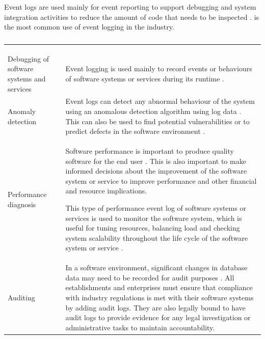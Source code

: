 Event logs are used mainly for event reporting to support debugging and system integration activities to reduce the amount of code that needs to be inspected \cite{Baccanico2014}.  is the most common use of event logging in the industry.

\begin{xltabular}{\textwidth}{p{4cm}X}
	\caption[Event logs usage]
	{\textit{Event logs usage}}
	\label{tbl:ch1_eventLogsUsage} \\
	\toprule
	 &  \\
	\midrule
	\endfirsthead

	\caption[]{\continueCaption} \\
	\toprule
	 &  \\
	\midrule
	\endhead

	\midrule
	 \\ 
	\endfoot
	\endlastfoot

	\RaggedRight Debugging of software systems and services & \RaggedRight Event logging is used mainly to record events or behaviours of software systems or services during its runtime \cite{Rong2018a}. \\

	\RaggedRight Anomaly detection & \RaggedRight Event logs can detect any abnormal behaviour of the system using an anomalous detection algorithm using log data \cite{Gurumdimma2016}. This can also be used to find potential vulnerabilities or to predict defects in the software environment \cite{Dwyer2013}. \\

	Performance diagnosis & \RaggedRight Software performance is important to produce quality software for the end user \cite{EvangelinGeetha2007, Baccanico2014}. This is also important to make informed decisions about the improvement of the software system or service to improve performance and other financial and resource implications. \par This type of performance event log of software systems or services is used to monitor the software system, which is useful for tuning resources, balancing load and checking system scalability throughout the life cycle of the software system or service \cite{Song2017}. \\
	
	Auditing & \RaggedRight In a software environment, significant changes in database data may need to be recorded for audit purposes \cite{Rong2018a}. All establishments and enterprises must ensure that compliance with industry regulations is met with their software systems by adding audit logs. They are also legally bound to have audit logs to provide evidence for any legal investigation or administrative tasks to maintain accountability. \\


\end{xltabular}
